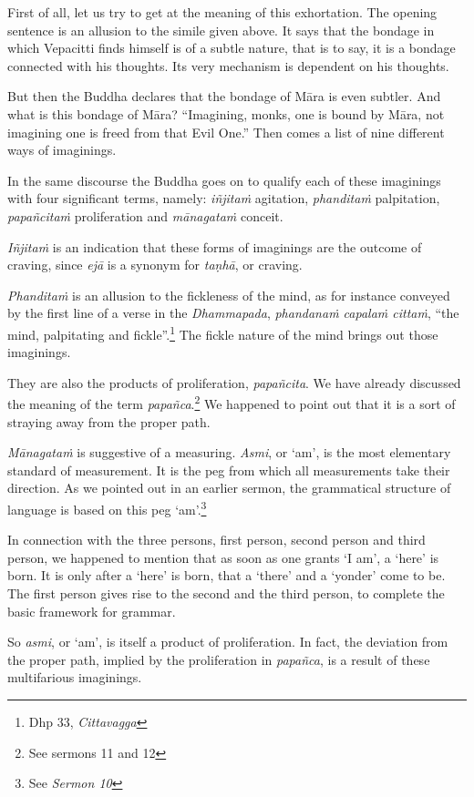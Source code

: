 First of all, let us try to get at the meaning of this exhortation. The opening sentence is an allusion to the simile given above. It says that the bondage in which Vepacitti finds himself is of a subtle nature, that is to say, it is a bondage connected with his thoughts. Its very mechanism is dependent on his thoughts.

But then the Buddha declares that the bondage of Māra is even subtler. And what is this bondage of Māra? ``Imagining, monks, one is bound by Māra, not imagining one is freed from that Evil One.'' Then comes a list of nine different ways of imaginings.

In the same discourse the Buddha goes on to qualify each of these imaginings with four significant terms, namely: \emph{iñjitaṁ} agitation, \emph{phanditaṁ} palpitation, \emph{papañcitaṁ} proliferation and \emph{mānagataṁ} conceit.

\emph{Iñjitaṁ} is an indication that these forms of imaginings are the outcome of craving, since \emph{ejā} is a synonym for \emph{taṇhā}, or craving.

\emph{Phanditaṁ} is an allusion to the fickleness of the mind, as for instance conveyed by the first line of a verse in the \emph{Dhammapada}, \emph{phandanaṁ capalaṁ cittaṁ}, ``the mind, palpitating and fickle''.\footnote{Dhp 33, \emph{Cittavagga}} The fickle nature of the mind brings out those imaginings.

They are also the products of proliferation, \emph{papañcita}. We have already discussed the meaning of the term \emph{papañca}.\footnote{See sermons 11 and 12} We happened to point out that it is a sort of straying away from the proper path.

\emph{Mānagataṁ} is suggestive of a measuring. \emph{Asmi}, or `am', is the most elementary standard of measurement. It is the peg from which all measurements take their direction. As we pointed out in an earlier sermon, the grammatical structure of language is based on this peg `am'.\footnote{See \emph{Sermon 10}}

In connection with the three persons, first person, second person and third person, we happened to mention that as soon as one grants `I am', a `here' is born. It is only after a `here' is born, that a `there' and a `yonder' come to be. The first person gives rise to the second and the third person, to complete the basic framework for grammar.

So \emph{asmi}, or `am', is itself a product of proliferation. In fact, the deviation from the proper path, implied by the proliferation in \emph{papañca}, is a result of these multifarious imaginings.


